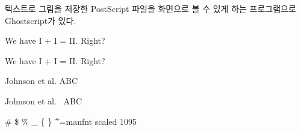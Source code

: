 \documentclass[11pt]{article}
\begin{document}
텍스트로 그림을 저장한 PostScript 파일을 화면으로 볼 수 있게 하는 프로그램으로  Ghostscript가 있다.

We have I + I = II. Right?

We have I + I = II\@. Right?

Johnson et al. ABC

Johnson et al. \ ABC

\# \$ \% \_ \{ \} \~ \^

\font \myfont=manfnt scaled 1095
{\myfont {}   %
    } \space \space
 
{\myfont {}   %
   }

{\myfont {}}{\myfont {}}{\myfont {}}%
{\myfont {}}{\myfont {}}{\myfont {}}%
{\myfont {}}{\myfont {}}
\end{document}
